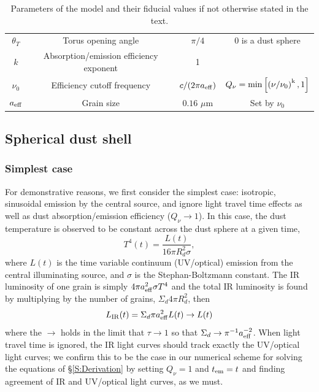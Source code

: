 \begin{table}
{\begin{tabular}{ c | c | c | c}
{$\theta_T$}     &  Torus opening angle                                   & $\pi/4$                     &   0 is a dust sphere\\
$k$             &  Absorption/emission efficiency exponent                      & 1                             &   \\
$\nu_0$     & Efficiency cutoff frequency                           &    $c/(2 \pi a_{\rm{eff}})$           & $Q_{\nu} = \rm{min}\left[ \left( \nu/ \nu_0 \right)^{k}, 1\right]$    \\
$a_{\rm{eff}}$  &  Grain size                                               &  $0.16$ $\mu$m                    &  Set by $\nu_0$       
 \end{tabular}
 }
 \caption{Parameters of the model and their fiducial values if not otherwise stated in the text.}
\label{Table:params}
\end{table}










\subsection{Spherical dust shell} 
\label{S:Interp:Sphere} 

\subsubsection{Simplest case}
For demonstrative reasons, we first consider the simplest case: isotropic,
sinusoidal emission by the central source, and ignore light travel time
effects as well as dust absorption/emission efficiency ($Q_{\nu} \rightarrow
1$). In this case, the dust temperature is observed to be constant across the
dust sphere at a given time,
\begin{equation}
T^4(t) =  \frac{L(t)}{16 \pi R^2_d \sigma},
\end{equation}
where $L(t)$ is the time variable continuum (UV/optical) emission from 
the central illuminating source, and $\sigma$
is the Stephan-Boltzmann constant. The IR luminosity of one grain is simply $4
\pi a^2_{\eff} \sigma T^4$ and the total IR luminosity is found by
multiplying by the number of grains, $\Sigma_d 4 \pi R^2_d$, then
\begin{equation}
L_{\rm{IR}}(t) =  \Sigma_d \pi a^2_{\eff} L(t) \rightarrow L(t)
\end{equation}
where the $\rightarrow$ holds in the limit that  $\tau  \rightarrow 1$  so
that $\Sigma_d \rightarrow \pi^{-1} a^{-2}_{\eff}$. When light travel time is
ignored, the IR light curves should track exactly the UV/optical light curves; we
confirm this to be the case in our numerical scheme for solving the equations
of \S \ref{S:Derivation} by setting $Q_{\nu} = 1$ and $t_{\em} = t$ and finding
agreement of IR and UV/optical light curves, as we must.

